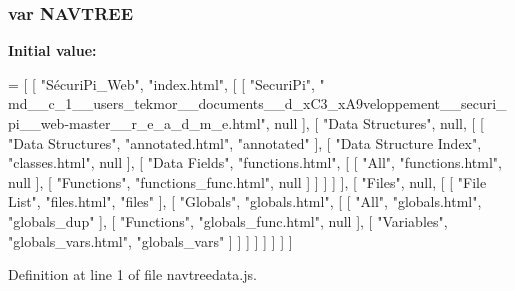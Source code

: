 \subsubsection[{N\+A\+V\+T\+R\+E\+E}]{\setlength{\rightskip}{0pt plus 5cm}var N\+A\+V\+T\+R\+E\+E}\label{navtreedata_8js_afc3e53a71ba26a8215797019b9b1451b}
{\bfseries Initial value\+:}
\begin{DoxyCode}
=
[
  [ \textcolor{stringliteral}{"SécuriPi\_Web"}, \textcolor{stringliteral}{"index.html"}, [
    [ \textcolor{stringliteral}{"SecuriPi"}, \textcolor{stringliteral}{"
      md\_\_c\_1\_\_users\_tekmor\_\_documents\_\_d\_xC3\_xA9veloppement\_\_securi\_pi\_\_web-master\_\_r\_e\_a\_d\_m\_e.html"}, null ],
    [ \textcolor{stringliteral}{"Data Structures"}, null, [
      [ \textcolor{stringliteral}{"Data Structures"}, \textcolor{stringliteral}{"annotated.html"}, \textcolor{stringliteral}{"annotated"} ],
      [ \textcolor{stringliteral}{"Data Structure Index"}, \textcolor{stringliteral}{"classes.html"}, null ],
      [ \textcolor{stringliteral}{"Data Fields"}, \textcolor{stringliteral}{"functions.html"}, [
        [ \textcolor{stringliteral}{"All"}, \textcolor{stringliteral}{"functions.html"}, null ],
        [ \textcolor{stringliteral}{"Functions"}, \textcolor{stringliteral}{"functions\_func.html"}, null ]
      ] ]
    ] ],
    [ \textcolor{stringliteral}{"Files"}, null, [
      [ \textcolor{stringliteral}{"File List"}, \textcolor{stringliteral}{"files.html"}, \textcolor{stringliteral}{"files"} ],
      [ \textcolor{stringliteral}{"Globals"}, \textcolor{stringliteral}{"globals.html"}, [
        [ \textcolor{stringliteral}{"All"}, \textcolor{stringliteral}{"globals.html"}, \textcolor{stringliteral}{"globals\_dup"} ],
        [ \textcolor{stringliteral}{"Functions"}, \textcolor{stringliteral}{"globals\_func.html"}, null ],
        [ \textcolor{stringliteral}{"Variables"}, \textcolor{stringliteral}{"globals\_vars.html"}, \textcolor{stringliteral}{"globals\_vars"} ]
      ] ]
    ] ]
  ] ]
]
\end{DoxyCode}


Definition at line 1 of file navtreedata.\+js.

